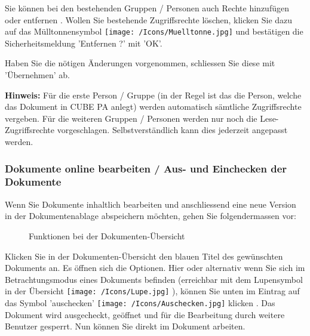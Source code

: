 \vspace{\baselineskip}

Sie können bei den bestehenden Gruppen / Personen auch Rechte hinzufügen oder entfernen . Wollen Sie bestehende Zugriffsrechte löschen, klicken Sie dazu auf das Mülltonnensymbol \texttt{[image: /Icons/Muelltonne.jpg]}  und bestätigen die Sicherheitsmeldung 'Entfernen ?' mit 'OK'.  \newline

Haben Sie die nötigen Änderungen vorgenommen, schliessen Sie diese mit 'Übernehmen' ab. 

\vspace{\baselineskip}

\textbf{Hinweis:} Für die erste Person / Gruppe (in der Regel ist das die Person, welche das Dokument in CUBE PA anlegt) werden automatisch sämtliche Zugriffsrechte vergeben. Für die weiteren Gruppen / Personen werden nur noch die Lese-Zugriffsrechte vorgeschlagen. Selbstverständlich kann dies jederzeit angepasst werden.

\subsubsection{Dokumente online bearbeiten / Aus- und Einchecken der Dokumente}
\label{bkm:Ref442780171}\label{bkm:Ref442776572}

Wenn Sie Dokumente inhaltlich bearbeiten und anschliessend eine neue Version in der Dokumentenablage abspeichern möchten, gehen Sie folgendermassen vor:

\begin{figure}[H]
\caption{Funktionen bei der Dokumenten-Übersicht}
\end{figure}

Klicken Sie in der Dokumenten-Übersicht den blauen Titel des gewünschten Dokuments  an. Es öffnen sich die Optionen. Hier oder alternativ wenn Sie sich im Betrachtungsmodus eines Dokuments befinden (erreichbar mit dem Lupensymbol in der Übersicht \texttt{[image: /Icons/Lupe.jpg]} ), können Sie unten im Eintrag auf das Symbol 'auschecken' \texttt{[image: /Icons/Auschecken.jpg]} klicken . Das Dokument wird ausgecheckt, geöffnet und für die Bearbeitung durch weitere Benutzer gesperrt. Nun können Sie direkt im Dokument arbeiten. 

